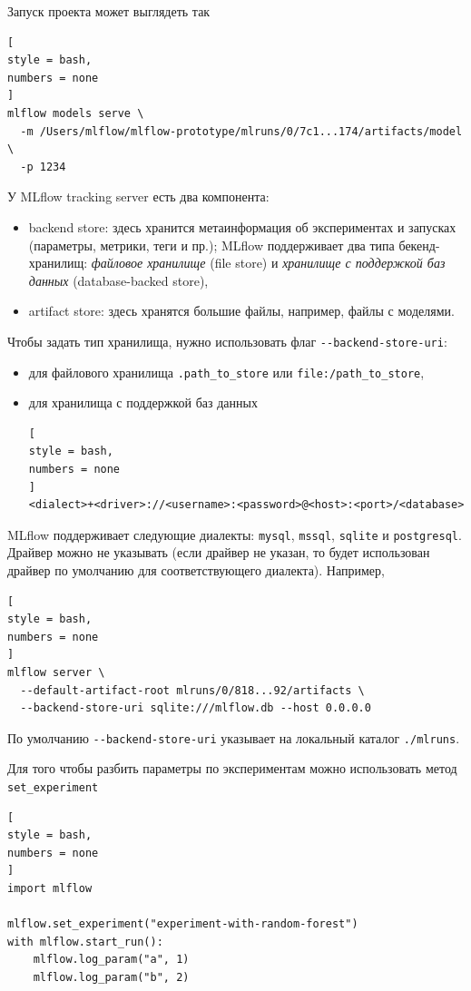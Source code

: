 \documentclass[%
	11pt,
	a4paper,
	utf8,
		]{article}
\begin{document}
Запуск проекта может выглядеть так
\begin{lstlisting}[
style = bash,
numbers = none	
]
mlflow models serve \
  -m /Users/mlflow/mlflow-prototype/mlruns/0/7c1...174/artifacts/model \
  -p 1234
\end{lstlisting}


У MLflow tracking server есть два компонента:
\begin{itemize}
	\item backend store: здесь хранится метаинформация об экспериментах и запусках (параметры, метрики, теги и пр.); MLflow поддерживает два типа бекенд-хранилищ: \emph{файловое хранилище} (file store) и \emph{хранилище с поддержкой баз данных} (database-backed store),
	
	\item artifact store: здесь хранятся большие файлы, например, файлы с моделями.
\end{itemize}

Чтобы задать тип хранилища, нужно использовать флаг \verb|--backend-store-uri|:
\begin{itemize}
	\item для файлового хранилища \verb|.path_to_store| или \verb|file:/path_to_store|,
	
	\item для хранилища с поддержкой баз данных
\begin{lstlisting}[
style = bash,
numbers = none	
]
<dialect>+<driver>://<username>:<password>@<host>:<port>/<database>
\end{lstlisting}
\end{itemize}

MLflow поддерживает следующие диалекты: \texttt{mysql}, \texttt{mssql}, \texttt{sqlite} и \texttt{postgresql}. Драйвер можно не указывать (если драйвер не указан, то будет использован драйвер по умолчанию для соответствующего диалекта). Например,
\begin{lstlisting}[
style = bash,
numbers = none	
]
mlflow server \
  --default-artifact-root mlruns/0/818...92/artifacts \
  --backend-store-uri sqlite:///mlflow.db --host 0.0.0.0
\end{lstlisting}

По умолчанию \verb|--backend-store-uri| указывает на локальный каталог \texttt{./mlruns}.

Для того чтобы разбить параметры по экспериментам можно использовать метод \texttt{set\_experiment}
\begin{lstlisting}[
style = bash,
numbers = none	
]
import mlflow

mlflow.set_experiment("experiment-with-random-forest")
with mlflow.start_run():
    mlflow.log_param("a", 1)
    mlflow.log_param("b", 2)
\end{lstlisting}
\end{document}
